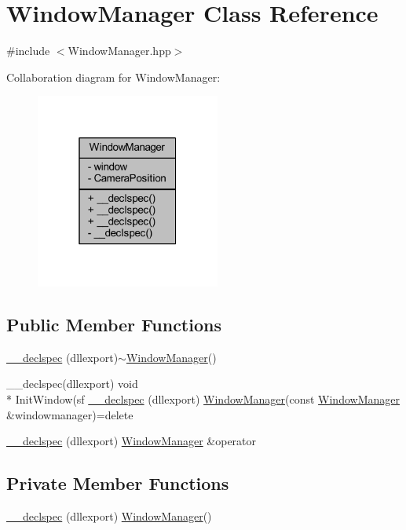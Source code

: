 \hypertarget{class_window_manager}{\section{Window\-Manager Class Reference}
\label{class_window_manager}
}


{\ttfamily \#include $<$Window\-Manager.\-hpp$>$}



Collaboration diagram for Window\-Manager\-:\nopagebreak
\begin{figure}[H]
\begin{center}
\leavevmode
\includegraphics[width=172pt]{class_window_manager__coll__graph}
\end{center}
\end{figure}
\subsection*{Public Member Functions}
\begin{DoxyCompactItemize}
\item 
\hyperlink{class_window_manager_a28362d6854fad720a0fe21f34272522b}{\-\_\-\-\_\-declspec} (dllexport)$\sim$\hyperlink{class_window_manager}{Window\-Manager}()
\item 
\-\_\-\-\_\-declspec(dllexport) void \\*
Init\-Window(sf \hyperlink{class_window_manager_a353d26a2d2ca4ddb533ac80dff4cb889}{\-\_\-\-\_\-declspec} (dllexport) \hyperlink{class_window_manager}{Window\-Manager}(const \hyperlink{class_window_manager}{Window\-Manager} \&windowmanager)=delete
\item 
\hyperlink{class_window_manager_a6b83e3acf96e8c764f9900227a6c3bf8}{\-\_\-\-\_\-declspec} (dllexport) \hyperlink{class_window_manager}{Window\-Manager} \&operator
\end{DoxyCompactItemize}
\subsection*{Private Member Functions}
\begin{DoxyCompactItemize}
\item 
\hyperlink{class_window_manager_ae3aaa9726e6964bb106ff0893f3dccfa}{\-\_\-\-\_\-declspec} (dllexport) \hyperlink{class_window_manager}{Window\-Manager}()
\end{DoxyCompactItemize}
